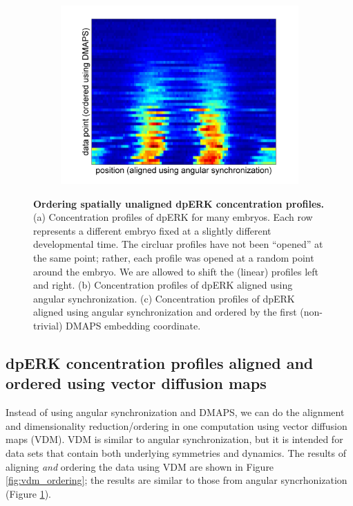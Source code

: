 \documentclass[10pt]{article}
\begin{document}
\begin{figure}[H]
\begin{subfigure}{0.3\textwidth}
\includegraphics[width=\textwidth]{data_ordered_angsynch}
\caption{}
\end{subfigure}
\caption{{\bf Ordering spatially unaligned dpERK concentration profiles.} (a) Concentration profiles of dpERK for many embryos. Each row represents a different embryo fixed at a slightly different developmental time. The circluar profiles have not been ``opened'' at the same point; rather, each profile was opened at a random point around the embryo. We are allowed to shift the (linear) profiles left and right.
(b) Concentration profiles of dpERK aligned using angular synchronization.
(c) Concentration profiles of dpERK aligned using angular synchronization and ordered by the first (non-trivial) DMAPS embedding coordinate.}
\label{fig:angsynch_ordering}
\end{figure}

\subsection*{dpERK concentration profiles aligned and ordered using vector diffusion maps}

Instead of using angular synchronization and DMAPS, we can do the alignment and dimensionality reduction/ordering in one computation using vector diffusion maps (VDM).
%
VDM is similar to angular synchronization, but it is intended for data sets that contain both underlying symmetries and dynamics.
%
The results of aligning {\em and} ordering the data using VDM are shown in Figure \ref{fig:vdm_ordering}; the results are similar to those from angular syncrhonization (Figure \ref{fig:angsynch_ordering}).
\end{document}
